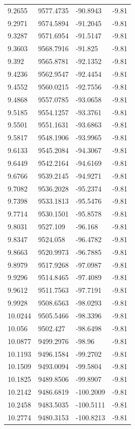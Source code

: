 \begin{table}[H]
\begin{tabular}{llll}
9.2655 & 9577.4735 & -90.8943 & -9.81 \\
9.2971 & 9574.5894 & -91.2045 & -9.81 \\
9.3287 & 9571.6954 & -91.5147 & -9.81 \\
9.3603 & 9568.7916 & -91.825 & -9.81 \\
9.392 & 9565.8781 & -92.1352 & -9.81 \\
9.4236 & 9562.9547 & -92.4454 & -9.81 \\
9.4552 & 9560.0215 & -92.7556 & -9.81 \\
9.4868 & 9557.0785 & -93.0658 & -9.81 \\
9.5185 & 9554.1257 & -93.3761 & -9.81 \\
9.5501 & 9551.1631 & -93.6863 & -9.81 \\
9.5817 & 9548.1906 & -93.9965 & -9.81 \\
9.6133 & 9545.2084 & -94.3067 & -9.81 \\
9.6449 & 9542.2164 & -94.6169 & -9.81 \\
9.6766 & 9539.2145 & -94.9271 & -9.81 \\
9.7082 & 9536.2028 & -95.2374 & -9.81 \\
9.7398 & 9533.1813 & -95.5476 & -9.81 \\
9.7714 & 9530.1501 & -95.8578 & -9.81 \\
9.8031 & 9527.109 & -96.168 & -9.81 \\
9.8347 & 9524.058 & -96.4782 & -9.81 \\
9.8663 & 9520.9973 & -96.7885 & -9.81 \\
9.8979 & 9517.9268 & -97.0987 & -9.81 \\
9.9296 & 9514.8465 & -97.4089 & -9.81 \\
9.9612 & 9511.7563 & -97.7191 & -9.81 \\
9.9928 & 9508.6563 & -98.0293 & -9.81 \\
10.0244 & 9505.5466 & -98.3396 & -9.81 \\
10.056 & 9502.427 & -98.6498 & -9.81 \\
10.0877 & 9499.2976 & -98.96 & -9.81 \\
10.1193 & 9496.1584 & -99.2702 & -9.81 \\
10.1509 & 9493.0094 & -99.5804 & -9.81 \\
10.1825 & 9489.8506 & -99.8907 & -9.81 \\
10.2142 & 9486.6819 & -100.2009 & -9.81 \\
10.2458 & 9483.5035 & -100.5111 & -9.81 \\
10.2774 & 9480.3153 & -100.8213 & -9.81 \\

\end{tabular}
\end{table}
